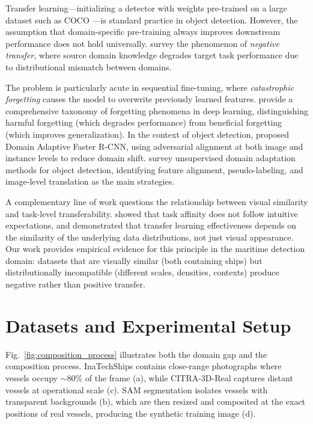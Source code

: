 \documentclass[a4paper,fleqn]{cas-dc}
\begin{document}
Transfer learning---initializing a detector with weights pre-trained on a large dataset such as COCO \citep{lin2014microsoft}---is standard practice in object detection. However, the assumption that domain-specific pre-training always improves downstream performance does not hold universally. \citet{zhang2023negative} survey the phenomenon of \emph{negative transfer}, where source domain knowledge degrades target task performance due to distributional mismatch between domains.

The problem is particularly acute in sequential fine-tuning, where \emph{catastrophic forgetting} \citep{mccloskey1989catastrophic, french1999catastrophic} causes the model to overwrite previously learned features. \citet{yang2024forgetting} provide a comprehensive taxonomy of forgetting phenomena in deep learning, distinguishing harmful forgetting (which degrades performance) from beneficial forgetting (which improves generalization). In the context of object detection, \citet{chen2018domain} proposed Domain Adaptive Faster R-CNN, using adversarial alignment at both image and instance levels to reduce domain shift. \citet{oza2023unsupervised} survey unsupervised domain adaptation methods for object detection, identifying feature alignment, pseudo-labeling, and image-level translation as the main strategies.

A complementary line of work questions the relationship between visual similarity and task-level transferability. \citet{zamir2018taskonomy} showed that task affinity does not follow intuitive expectations, and \citet{cui2018large} demonstrated that transfer learning effectiveness depends on the similarity of the underlying data distributions, not just visual appearance. Our work provides empirical evidence for this principle in the maritime detection domain: datasets that are visually similar (both containing ships) but distributionally incompatible (different scales, densities, contexts) produce negative rather than positive transfer.

\section{Datasets and Experimental Setup}\label{sec:setup}

Fig.~\ref{fig:composition_process} illustrates both the domain gap and the composition process. InaTechShips contains close-range photographs where vessels occupy $\sim$80\% of the frame (a), while CITRA-3D-Real captures distant vessels at operational scale (c). SAM segmentation isolates vessels with transparent backgrounds (b), which are then resized and composited at the exact positions of real vessels, producing the synthetic training image (d).
\end{document}
